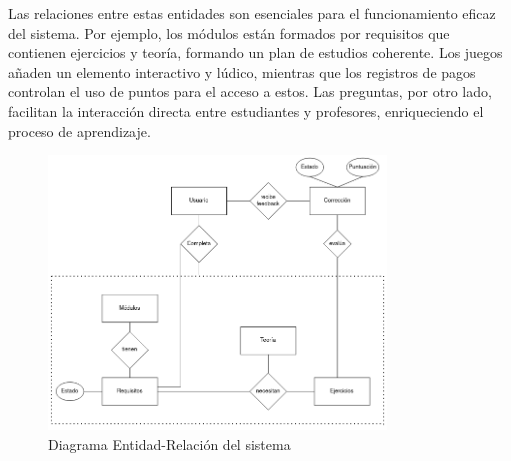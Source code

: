 Las relaciones entre estas entidades son esenciales para el funcionamiento eficaz del sistema. Por ejemplo, los módulos están formados por requisitos que contienen ejercicios y teoría, formando un plan de estudios coherente. Los juegos añaden un elemento interactivo y lúdico, mientras que los registros de pagos controlan el uso de puntos para el acceso a estos. Las preguntas, por otro lado, facilitan la interacción directa entre estudiantes y profesores, enriqueciendo el proceso de aprendizaje.

\begin{figure}[H]
    \centering
    \includegraphics[width=0.8\textwidth]{imagenes/Entidad-Relacion.png}
    \caption{Diagrama Entidad-Relación del sistema}
    \label{fig:er}
\end{figure}

